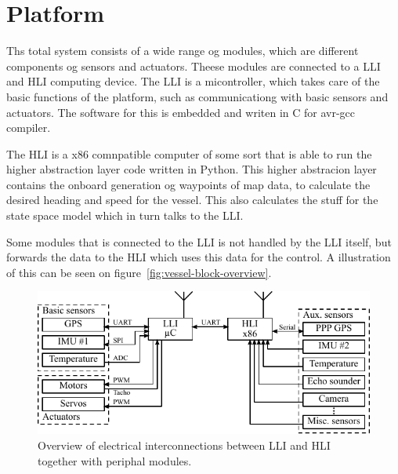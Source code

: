 \chapter{Platform}

\noindent Ths total system consists of a wide range og modules, which are different components og sensors and actuators. Theese modules are connected to a \ac{LLI} and \ac{HLI} computing device. The \ac{LLI} is a micontroller, which takes care of the basic functions of the platform, such as communicationg with basic sensors and actuators. The software for this is embedded and writen in C for avr-gcc compiler.

The \ac{HLI} is a x86 comnpatible computer of some sort that is able to run the higher abstraction layer code written in Python. This higher abstracion layer contains the onboard generation og waypoints of map data, to calculate the desired heading and speed for the vessel. This also calculates the stuff for the state space model which in turn talks to the \ac{LLI}.

Some modules that is connected to the \ac{LLI} is not handled by the \ac{LLI} itself, but forwards the data to the \ac{HLI} which uses this data for the control. A illustration of this can be seen on figure~\vref{fig:vessel-block-overview}.


\begin{figure}[htbp]
	\centering
	\includegraphics[width=\textwidth]{img/vessel-block-overview-electrical}
	\caption{Overview of electrical interconnections between \ac{LLI} and \ac{HLI} together with periphal modules.}
	\label{fig:vessel-block-overview-electrical}
\end{figure}
